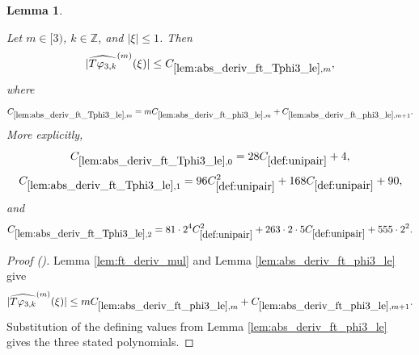 \documentclass[12pt,reqno]{amsart}
\newcommand{\auto}{{({\tiny\faCar})}}
\theoremstyle{plain}
\newtheorem{lemma}[theorem]{Lemma}
\numberwithin{equation}{section}
\theoremstyle{remark}
\newcommand{\uses}[1]{}
\newcommand{\usesdefs}[1]{}
\newcommand{\leanok}{}
\newcommand{\lean}[1]{}
\newcommand{\Z}{{\mathbb Z}}
\begin{document}
\begin{lemma}\label{lem:abs_deriv_ft_Tphi3_le}\uses{lem:ft_deriv_mul,lem:abs_deriv_ft_phi3_le}\usesdefs{def:unipair,defn:window based bump functions}
\lean{Auto.absDerivFourierTPhiThreeLe}
\leanok
Let $m\in[3)$, $k\in\Z$, and $|\xi|\le1$. Then
\begin{equation}\label{auto:T-varphi-three-Fourier-derivative-bound}
|\widehat{T\varphi_{3,k}}^{(m)}(\xi)|
\le C_{\ref{lem:abs_deriv_ft_Tphi3_le},m},
\end{equation}
where
\begin{equation}\label{auto:T-varphi-three-Fourier-derivative-constant}
C_{\ref{lem:abs_deriv_ft_Tphi3_le},m}
=mC_{\ref{lem:abs_deriv_ft_phi3_le},m}
+C_{\ref{lem:abs_deriv_ft_phi3_le},m+1}.
\end{equation}
More explicitly,
\begin{equation}\label{auto:T-varphi-three-Fourier-derivative-constant-zero-exact}
C_{\ref{lem:abs_deriv_ft_Tphi3_le},0}=28C_{\ref{def:unipair}}+4,
\end{equation}
\begin{equation}\label{auto:T-varphi-three-Fourier-derivative-constant-one-exact}
C_{\ref{lem:abs_deriv_ft_Tphi3_le},1}=96C_{\ref{def:unipair}}^2+168C_{\ref{def:unipair}}+90,
\end{equation}
and
\begin{equation}\label{auto:T-varphi-three-Fourier-derivative-constant-two-exact}
C_{\ref{lem:abs_deriv_ft_Tphi3_le},2}=81\cdot2^4C_{\ref{def:unipair}}^2+263\cdot2\cdot5C_{\ref{def:unipair}}+555\cdot2^2.
\end{equation}
\end{lemma}
\begin{proof}[Proof \auto]
Lemma \ref{lem:ft_deriv_mul} and Lemma \ref{lem:abs_deriv_ft_phi3_le} give
\[
|\widehat{T\varphi_{3,k}}^{(m)}(\xi)|
\le
mC_{\ref{lem:abs_deriv_ft_phi3_le},m}
+C_{\ref{lem:abs_deriv_ft_phi3_le},m+1}.
\]
Substitution of the defining values from Lemma \ref{lem:abs_deriv_ft_phi3_le} gives the three stated polynomials.
\end{proof}
\end{document}
